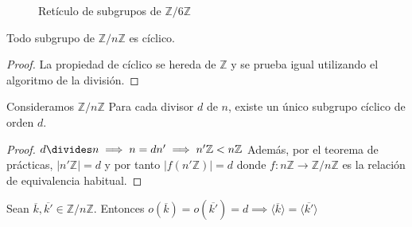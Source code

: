 \documentclass{book}
\theoremstyle{definition}
\theoremstyle{remark}
\newcommand{\Z}{\mathbb{Z}}
\newcommand{\ZnZ}{\mathbb{Z}/n\mathbb{Z}}
\begin{document}
\begin{figure}[h]
	\centering
	\label{fig:reticulo6z}
	\caption{Retículo de subgrupos de $\mathbb{Z}/6\mathbb{Z}$}
\end{figure}

\begin{thm}
	Todo subgrupo de $\ZnZ$ es cíclico.
\end{thm}

\begin{proof}
	La propiedad de cíclico se hereda de $\Z$ y se prueba igual utilizando el algoritmo de la división. %
\end{proof}

\begin{thm}
	Consideramos $\ZnZ$ Para cada divisor $d$ de $n$, existe un único subgrupo cíclico de orden $d$.
\end{thm}

\begin{proof}
	$d \divides n \implies n = dn' \implies n'\Z < n\Z$ Además, por el teorema de prácticas, $|n'\Z| = d$ y por tanto $|f(n'\Z)| = d$ donde $f:n\Z \to \ZnZ$ es la relación de equivalencia habitual.
\end{proof}

\begin{thm}
	Sean $\overline{k}, \overline{k'} \in \ZnZ$. Entonces $o(\overline{k}) = o(\overline{k'}) = d \implies \langle \overline{k} \rangle = \langle \overline{k'} \rangle$ 
\end{thm}
\end{document}
